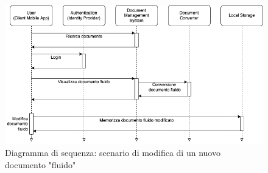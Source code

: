 \begin{figure}[H]
\centering
\includegraphics[width=1\textwidth]{img/tesi-2-Use-case2.drawio.png}
\caption{Diagramma di sequenza: scenario di modifica di un nuovo documento "fluido"}
\end{figure}

